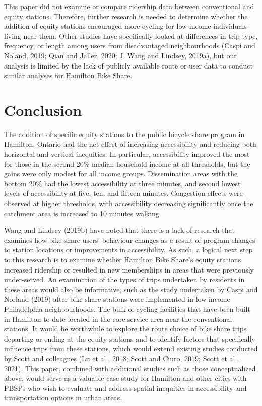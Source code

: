 \documentclass[]{elsarticle} %
\begin{document}
This paper did not examine or compare ridership data between
conventional and equity stations. Therefore, further research is needed
to determine whether the addition of equity stations encouraged more
cycling for low-income individuals living near them. Other studies have
specifically looked at differences in trip type, frequency, or length
among users from disadvantaged neighbourhoods (Caspi and Noland, 2019;
Qian and Jaller, 2020; J. Wang and Lindsey, 2019a), but our analysis is
limited by the lack of publicly available route or user data to conduct
similar analyses for Hamilton Bike Share.

\hypertarget{conclusion}{%
\section{Conclusion}\label{conclusion}}

The addition of specific equity stations to the public bicycle share
program in Hamilton, Ontario had the net effect of increasing
accessibility and reducing both horizontal and vertical inequities. In
particular, accessibility improved the most for those in the second 20\%
median household income at all thresholds, but the gains were only
modest for all income groups. Dissemination areas with the bottom 20\%
had the lowest accessibility at three minutes, and second lowest levels
of accessibility at five, ten, and fifteen minutes. Congestion effects
were observed at higher thresholds, with accessibility decreasing
significantly once the catchment area is increased to 10 minutes
walking.

Wang and Lindsey (2019b) have noted that there is a lack of research
that examines how bike share users' behaviour changes as a result of
program changes to station locations or improvements in accessibility.
As such, a logical next step to this research is to examine whether
Hamilton Bike Share's equity stations increased ridership or resulted in
new memberships in areas that were previously under-served. An
examination of the types of trips undertaken by residents in these areas
would also be informative, such as the study undertaken by Caspi and
Norland (2019) after bike share stations were implemented in low-income
Philadelphia neighbourhoods. The bulk of cycling facilities that have
been built in Hamilton to date located in the core service area near the
conventional stations. It would be worthwhile to explore the route
choice of bike share trips departing or ending at the equity stations
and to identify factors that specifically influence trips from these
stations, which would extend existing studies conducted by Scott and
colleagues (Lu et al., 2018; Scott and Ciuro, 2019; Scott et al., 2021).
This paper, combined with additional studies such as those
conceptualized above, would serve as a valuable case study for Hamilton
and other cities with PBSPs who wish to evaluate and address spatial
inequities in accessibility and transportation options in urban areas.
\end{document}

